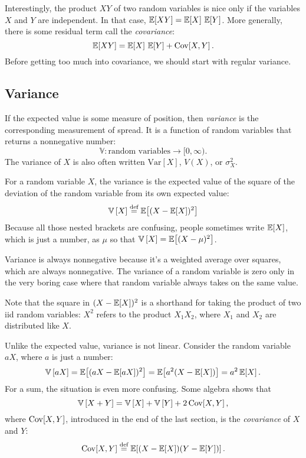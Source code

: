 Interestingly, the product $XY$ of two random variables is nice only if the
variables $X$ and $Y$ are independent. In that case, $\mathbb{E}\!\left[{XY}\right] = \mathbb{E}\!\left[{X}\right]\,\mathbb{E}\!\left[{Y}\right]$.
More generally, there is some residual term call the \emph{covariance}:
\begin{equation}
\mathbb{E}\!\left[{XY}\right] = \mathbb{E}\!\left[{X}\right] \, \mathbb{E}\!\left[{Y}\right] + \mathrm{Cov}\!\left[{X, Y}\right].
\end{equation}
Before getting too much into covariance, we should start with regular variance.

\subsection{Variance}

If the expected value is some measure of position, then \emph{variance} is the
corresponding measurement of spread. It is a function of random variables that
returns a nonnegative number:
\begin{equation*}
\mathbb{V} : \text{random variables} \to [0, \infty).
\end{equation*}
The variance of $X$ is also often written $\mathrm{Var}[X]$, $V(X)$, or $\sigma^2_X$.

For a random variable $X$, the variance is the expected value of the square of
the deviation of the random variable from its own expected value:
\begin{equation*}
\mathbb{V}\left[{X}\right] \stackrel{\text{def}}{=} \mathbb{E}\!\left[{(X - \mathbb{E}\!\left[{X}\right])^2}\right]
\end{equation*}
Because all those nested brackets are confusing, people sometimes write
$\mathbb{E}\!\left[{X}\right]$, which is just a number, as $\mu$ so that $\mathbb{V}\left[{X}\right] = \mathbb{E}\!\left[{(X -
\mu)^2}\right]$.

Variance is always nonnegative because it's a weighted average over squares,
which are always nonnegative. The variance of a random variable is zero only
in the very boring case where that random variable always takes on the same
value.

Note that the square in $(X - \mathbb{E}\!\left[{X}\right])^2$ is a shorthand for taking the
product of two iid random variables: $X^2$ refers to the product $X_1 X_2$,
where $X_1$ and $X_2$ are distributed like $X$.

Unlike the expected value, variance is not linear. Consider the random variable $aX$,
where $a$ is just a number:
\begin{equation}
\mathbb{V}\left[{aX}\right] = \mathbb{E}\!\left[{(aX - \mathbb{E}\!\left[{aX}\right])^2}\right] = \mathbb{E}\!\left[{a^2(X - \mathbb{E}\!\left[{X}\right])}\right] = a^2 \, \mathbb{E}\!\left[{X}\right].
\end{equation}
For a sum, the situation is even more confusing. Some algebra shows that
\begin{equation*}
\mathbb{V}\left[{X + Y}\right] = \mathbb{V}\left[{X}\right] + \mathbb{V}\left[{Y}\right] + 2 \,\mathrm{Cov}\!\left[{X, Y}\right],
\end{equation*}
where $\mathrm{Cov}\!\left[{X, Y}\right]$, introduced in the end of the last section, is the
\emph{covariance} of $X$ and $Y$:
\begin{equation}
\mathrm{Cov}\!\left[{X, Y}\right] \stackrel{\text{def}}{=} \mathbb{E}\!\left[{(X - \mathbb{E}\!\left[{X}\right])(Y - \mathbb{E}\!\left[{Y}\right])}\right].
\end{equation}

